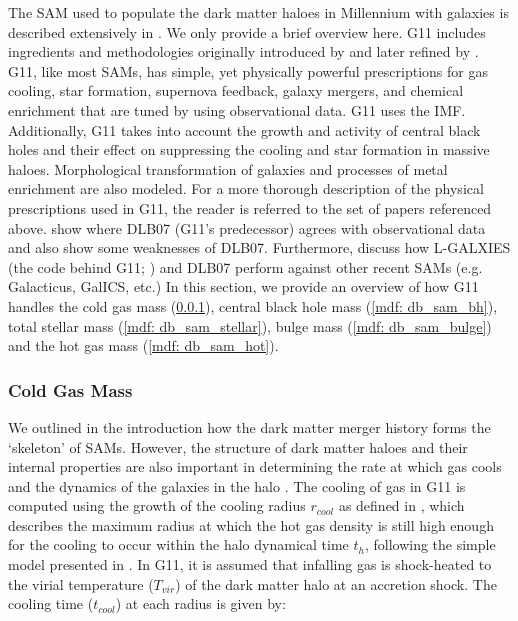 \documentclass[a4paper,fleqn,usenatbib]{mnras}
\begin{document}
\par The SAM used to populate the dark matter haloes in Millennium with galaxies is described extensively in \citet{springel2005simulations, croton2006many, de2006formation, de2007hierarchical, guo2011dwarf}. We only provide a brief overview here. G11 includes ingredients and methodologies originally introduced by \citet{white1991galaxy} and later refined by \citet{springel2001populating, de2004chemical, croton2006many}. G11, like most SAMs, has simple, yet physically powerful prescriptions for gas cooling, star formation, supernova feedback, galaxy mergers, and chemical enrichment that are tuned by using observational data. G11 uses the \citet{chabrier2003galactic} IMF. Additionally, G11 takes into account the growth and activity of central black holes and their effect on suppressing the cooling and star formation in massive haloes. Morphological transformation of galaxies and processes of metal enrichment are also modeled. For a more thorough description of the physical prescriptions used in G11, the reader is referred to the set of papers referenced above. \citet{liu2010stellar, de2011comparison, cucciati2012comparison} show where DLB07 (G11's predecessor) agrees with observational data and also show  some weaknesses of DLB07. Furthermore, \citet{knebe2015nifty} discuss how L-GALXIES (the code behind G11; \citet{henriques2013simulations}) and DLB07 perform against other recent SAMs (e.g. Galacticus, GalICS, etc.) In this section, we provide an overview of how G11 handles the cold gas mass (\ref{mdf: db_sam_cold}), central black hole mass (\ref{mdf: db_sam_bh}), total stellar mass (\ref{mdf: db_sam_stellar}), bulge mass (\ref{mdf: db_sam_bulge}) and the hot gas mass (\ref{mdf: db_sam_hot}).

\subsubsection{Cold Gas Mass} \label{mdf: db_sam_cold}
\par
We outlined in the introduction how the dark matter merger history forms the `skeleton' of SAMs. However, the structure of dark matter haloes and their internal properties are also important in determining the rate at which gas cools and the dynamics of the galaxies in the halo \citep{baugh2006primer}. The cooling of gas in G11 is computed using the growth of the cooling radius $r_{cool}$ as defined in \citet{croton2006many, guo2011dwarf}, which describes the maximum radius at which the hot gas density is still high enough for the cooling to occur within the halo dynamical time $t_h$, following the simple model presented in \citet{springel2001populating}. In G11, it is assumed that infalling gas is shock-heated to the virial temperature ($T_{vir}$) of the dark matter halo at an accretion shock. The cooling time ($t_{cool}$) at each radius is given by:
\end{document}
